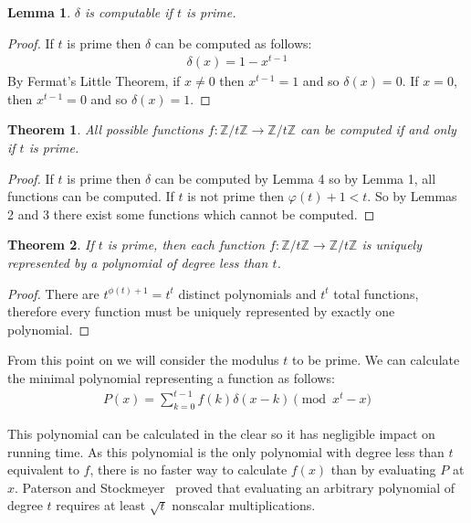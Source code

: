\documentclass{article}
\def\zt{\mathbb{Z}/t\mathbb{Z}}
\newtheorem{thm}{Theorem}
\newtheorem{lem}{Lemma}
\begin{document}
    \begin{lem}
        $\delta$ is computable if $t$ is prime.
    \end{lem}
    \begin{proof}
        If $t$ is prime then $\delta$ can be computed as follows:
        \begin{align}
            \delta(x) = 1 - x^{t - 1}
        \end{align}
        By Fermat's Little Theorem, if $x \neq 0$ then $x^{t - 1} = 1$ and so $\delta(x) = 0$.
        If $x = 0$, then $x^{t - 1} = 0$ and so $\delta(x) = 1$. 
    \end{proof}

    \begin{thm}
        All possible functions 
        $f:\zt\to\zt$ 
        can be computed if and only if $t$ is prime.
    \end{thm}
    \begin{proof}
        If $t$ is prime then $\delta$ can be computed by Lemma 4 so by Lemma 1, all functions can be computed.
        If $t$ is not prime then $\varphi(t) + 1 < t$. So by Lemmas 2 and 3
        there exist some functions which cannot be computed.
    \end{proof}

    \begin{thm}
        If $t$ is prime, then each function 
        $f:\zt\to\zt$ 
        is uniquely represented by a polynomial of degree less than $t$. 
    \end{thm}
    \begin{proof}
        There are $t^{\phi(t) +1} = t^t$ distinct polynomials and $t^t$ total functions, therefore every function must be uniquely represented by exactly one polynomial.
    \end{proof}

    From this point on we will consider the modulus $t$ to be prime.
    We can calculate the minimal polynomial representing a function as follows:
    \begin{align}
        P(x) = \sum_{k = 0}^{t-1} f(k)\delta(x - k)\pmod{x^t - x}
    \end{align}

    This polynomial can be calculated in the clear so it has negligible impact on running time.
    As this polynomial is 
    the only polynomial with degree less than $t$ equivalent to $f$,
    there is no faster way to calculate $f(x)$ than by evaluating $P$ at $x$.
    Paterson and Stockmeyer~\cite{paterson} proved that evaluating an arbitrary polynomial of degree
    $t$ requires at least $\sqrt{t}$ nonscalar multiplications.
\end{document}
